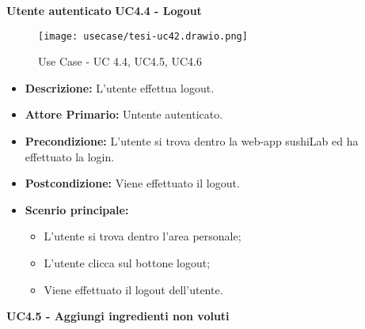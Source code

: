 \textbf{Utente autenticato}
\textbf{UC4.4 - Logout}
\begin{figure}[H]
    \centering
    \texttt{[image: usecase/tesi-uc42.drawio.png]}
    \caption{Use Case - UC 4.4, UC4.5, UC4.6}
\end{figure}
\begin{itemize}
    \item \textbf{Descrizione:} L'utente effettua logout.
    \item \textbf{Attore Primario:} Untente autenticato.
    \item \textbf{Precondizione:} L'utente si trova dentro la web-app sushiLab ed ha effettuato la login.
    \item \textbf{Postcondizione:} Viene effettuato il logout.
    \item \textbf{Scenrio principale:}
    \begin{itemize}
        \item L'utente si trova dentro l'area personale;
        \item L'utente clicca sul bottone logout;
        \item Viene effettuato il logout dell'utente.
    \end{itemize}
\end{itemize}
\textbf{UC4.5 - Aggiungi ingredienti non voluti}
